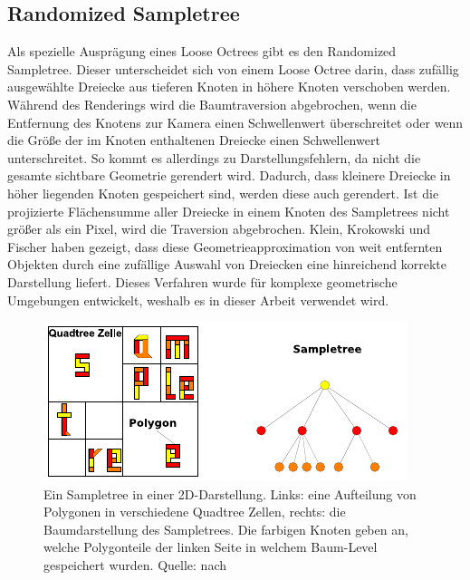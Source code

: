 \subsection{Randomized Sampletree}
\label{sec:basics:sampletree}
Als spezielle Ausprägung eines Loose Octrees gibt es den Randomized Sampletree. Dieser unterscheidet sich von einem Loose Octree darin, dass zufällig ausgewählte Dreiecke aus tieferen Knoten in höhere Knoten verschoben werden. Während des Renderings wird die Baumtraversion abgebrochen, wenn die Entfernung des Knotens zur Kamera einen Schwellenwert überschreitet oder wenn die Größe der im Knoten enthaltenen Dreiecke einen Schwellenwert unterschreitet. So kommt es allerdings zu Darstellungsfehlern, da nicht die gesamte sichtbare Geometrie gerendert wird. Dadurch, dass kleinere Dreiecke in höher liegenden Knoten gespeichert sind, werden diese auch gerendert. Ist die projizierte Flächensumme aller Dreiecke in einem Knoten des Sampletrees nicht größer als ein Pixel, wird die Traversion abgebrochen. Klein, Krokowski und Fischer haben gezeigt, dass diese Geometrieapproximation von weit entfernten Objekten durch eine zufällige Auswahl von Dreiecken eine hinreichend korrekte Darstellung liefert. Dieses Verfahren wurde für komplexe geometrische Umgebungen entwickelt, weshalb es in dieser Arbeit verwendet wird.
\begin{figure}
 \centering
  \includegraphics[scale=1.7]{images/sampletree2.pdf}
  \caption{Ein Sampletree in einer 2D-Darstellung. Links: eine Aufteilung von Polygonen in verschiedene Quadtree Zellen, rechts: die Baumdarstellung des Sampletrees. Die farbigen Knoten geben an, welche Polygonteile der linken Seite in welchem Baum-Level gespeichert wurden. Quelle: nach}
 \label{fig:basics:sampletree}
\end{figure}

